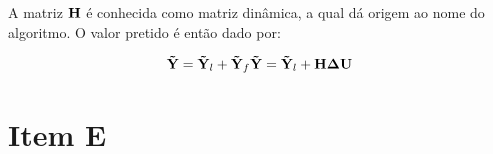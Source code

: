 A matriz $\mathbf{H}$ é conhecida como matriz dinâmica, a qual dá origem ao nome do
algoritmo. O valor pretido é então dado por:

\begin{equation}\label{eq:y_pred_mat}
\mathbf{\tilde{Y}} = \mathbf{\tilde{Y}}_l + \mathbf{\tilde{Y}}_f
\mathbf{\tilde{Y}} = \mathbf{\tilde{Y}}_l + \mathbf{H\Delta U}
\end{equation}

\section*{Item E}
